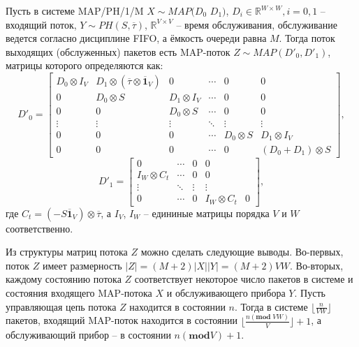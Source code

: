 \begin{thm}\label{th:ch4_map_departure}\textnormal{\cite{VishnevskyDudin2018}}
    Пусть в системе MAP/PH/1/M $X \sim MAP(D_{0}$ $D_{1})$, $D_i \in \mathbb{R}^{W \times W}, i=0,1$ -- входящий поток, $Y \sim PH(S, \overline{\tau})$, $\mathbb{R}^{V \times V}$ -- время обслуживания, обслуживание ведется согласно дисциплине FIFO, а ёмкость очереди равна $M$. Тогда поток выходящих (обслуженных) пакетов есть MAP-поток $Z \sim MAP(D'_{0},D'_{1})$, матрицы которого определяются как:
    \begin{equation}
        \label{eq:ch4_qs_departure_d0}
        D'_{0} =
        \begin{bmatrix}
            D_{0} \otimes I_{V} & D_{1}\otimes (\overline{\tau} \otimes \overline{\mathbf{1}}_{V}) & 0 & \cdots & 0 & 0\\
            0 & D_{0} \otimes S & D_{1} \otimes I_{V} & \cdots & 0 & 0\\
            0 & 0 & D_{0} \otimes S & \cdots & 0 & 0 \\
            \vdots & \vdots & \vdots & \ddots & \vdots & \vdots \\
            0 & 0 & 0 & \cdots & D_{0} \otimes S & D_{1} \otimes I_{V}\\
            0 & 0 & 0 & \cdots & 0 & (D_{0}+D_{1}) \otimes S
        \end{bmatrix},
    \end{equation}
    \begin{equation}
        \label{eq:ch4_qs_departure_d1}
        D'_{1} =
          \begin{bmatrix}
              0 & \cdots & 0 & 0 \\
              I_{W} \otimes C_{t} & \cdots & 0 & 0 \\
              \vdots & \ddots & \vdots & \vdots \\
              0 & \cdots & 0 & I_{W} \otimes C_{t} & 0
          \end{bmatrix},
    \end{equation}
    где $C_{t} = (-S \overline{\mathbf{1}}_{V}) \otimes \overline{\tau}$, а $I_V$, $I_W$ -- едининые матрицы порядка $V$ и $W$ соответственно.
\end{thm}

Из структуры матриц потока $Z$ можно сделать следующие выводы. Во-первых, поток $Z$ имеет размерность $|Z| = (M+2)|X| |Y| = (M+2) V W$. Во-вторых, каждому состоянию потока $Z$ соответствует некоторое число пакетов в системе и состояния входящего MAP-потока $X$ и обслуживающего прибора $Y$. Пусть управляющая цепь потока $Z$ находится в состоянии $n$. Тогда в системе $\lfloor \frac{n}{VW} \rfloor$ пакетов, входящий MAP-поток находится в состоянии $\lfloor \frac{n (\mathbf{mod}\;VW)}{V} \rfloor + 1$, а обслуживающий прибор -- в состоянии $n(\mathbf{mod} V)+1$.

